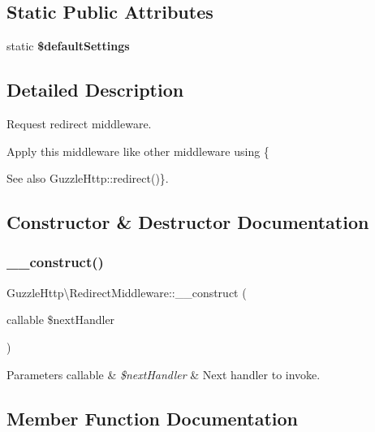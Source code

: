 \subsection*{Static Public Attributes}
\begin{DoxyCompactItemize}
\item 
static {\bfseries \$default\+Settings}
\end{DoxyCompactItemize}


\subsection{Detailed Description}
Request redirect middleware.

Apply this middleware like other middleware using \{\begin{DoxySeeAlso}{See also}
Guzzle\+Http\+::redirect()\}. 
\end{DoxySeeAlso}


\subsection{Constructor \& Destructor Documentation}
\mbox{\label{classGuzzleHttp_1_1RedirectMiddleware_a4ee9dcdc33181a39a8abd9ef09b595cf}} 
\subsubsection{\texorpdfstring{\+\_\+\+\_\+construct()}{\_\_construct()}}
{\footnotesize\ttfamily Guzzle\+Http\textbackslash{}\+Redirect\+Middleware\+::\+\_\+\+\_\+construct (\begin{DoxyParamCaption}\item[{callable}]{\$next\+Handler }\end{DoxyParamCaption})}


\begin{DoxyParams}[1]{Parameters}
callable & {\em \$next\+Handler} & Next handler to invoke. \\
\hline
\end{DoxyParams}


\subsection{Member Function Documentation}
\mbox{\label{classGuzzleHttp_1_1RedirectMiddleware_a48bae420b672649ad449d61dfb70cc70}} 
